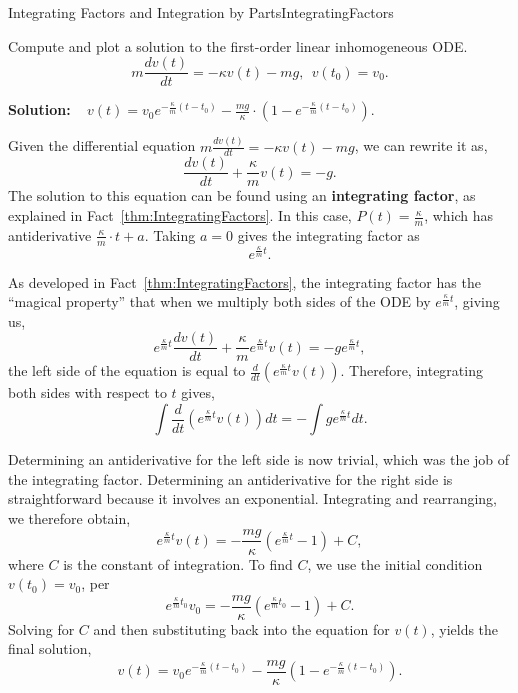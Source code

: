 \begin{factColor}{Integrating Factors and Integration by Parts}{IntegratingFactors}
\end{factColor}

\bigskip

\begin{example} 
\label{eq:ChuteODE03}
Compute and plot a solution to the first-order linear inhomogeneous ODE.
\begin{equation}
\label{eq:1stOrderLinearNonHomogeneous}
   m \frac{dv(t)}{dt} = - \kappa v(t) -  m g,  ~~v(t_0) = v_0.
\end{equation}
    
\end{example}
\textbf{Solution:} \Ans~ $v(t) =   v_0 e^{-\frac{\kappa}{m}(t - t_0)} - \frac{mg}{\kappa} \cdot \left( 1 - e^{-\frac{\kappa}{m}(t - t_0)} \right)$.

Given the differential equation \( m \frac{dv(t)}{dt} =- \kappa v(t) -   mg  \), we can rewrite it as,
$$ \frac{dv(t)}{dt} + \frac{\kappa}{m} v(t) = -g. $$
The solution to this equation can be found using an \textbf{integrating factor}, as explained in Fact~\ref{thm:IntegratingFactors}. In this case, $P(t) = \frac{\kappa}{m}$, which has antiderivative $ \frac{\kappa}{m}\cdot t + a$. Taking $a=0$ gives the integrating factor as 
$$ e^{\frac{\kappa}{m}t}. $$

As developed in Fact~\ref{thm:IntegratingFactors}, the integrating factor has the ``magical property'' that when we multiply both sides of the ODE by  \( e^{\frac{\kappa}{m}t} \), giving us,
$$ e^{\frac{\kappa}{m}t} \frac{dv(t)}{dt} + \frac{\kappa}{m} e^{\frac{\kappa}{m}t} v(t) = -g e^{\frac{\kappa}{m}t}, $$
the left side of the equation is equal to \( \frac{d}{dt} \left(e^{\frac{\kappa}{m}t} v(t) \right)\). Therefore, integrating both sides with respect to \( t \) gives,
$$ \int \frac{d}{dt} \left( e^{\frac{\kappa}{m}t} v(t) \right) dt = -\int g e^{\frac{\kappa}{m}t} dt. $$

Determining an antiderivative for the left side is now trivial, which was the job of the integrating factor. Determining an antiderivative for the right side is straightforward because it involves an exponential. 
Integrating and rearranging, we therefore obtain,
$$ e^{\frac{\kappa}{m}t} v(t) = -\frac{mg}{\kappa} \left( e^{\frac{\kappa}{m}t} - 1 \right) + C, $$
where \( C \) is the constant of integration. To find \( C \), we use the initial condition \( v(t_0) = v_0 \), per
$$ e^{\frac{\kappa}{m}t_0} v_0 = -\frac{mg}{\kappa} \left( e^{\frac{\kappa}{m}t_0} - 1 \right) + C. $$
Solving for \( C \) and then substituting back into the equation for \( v(t) \), yields the final solution,
$$ v(t) =v_0 e^{-\frac{\kappa}{m}(t - t_0)} - \frac{mg}{\kappa} \left( 1 - e^{-\frac{\kappa}{m}(t - t_0)} \right).$$

